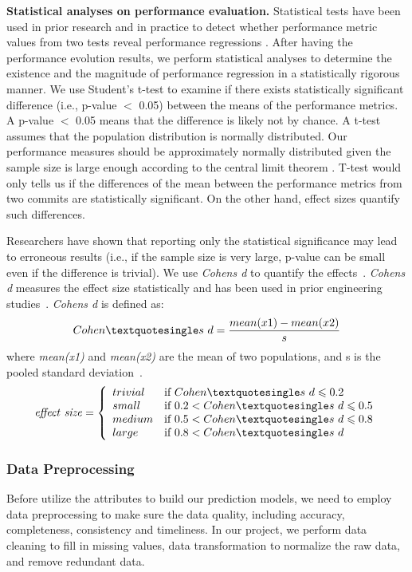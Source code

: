 \textbf{Statistical analyses on performance evaluation.}
Statistical tests have been used in prior research and in practice to detect whether performance metric values from two tests reveal performance regressions \cite{AlGhmadi}. After having the performance evolution results, we perform statistical analyses to determine the existence and the magnitude of performance regression in a statistically rigorous manner. 
We use Student’s t-test to examine if there exists statistically significant difference (i.e., p-value $<$ 0.05) between the means of the performance metrics. A p-value $<$ 0.05 means that the difference is likely not by chance. 
A t-test assumes that the population distribution is normally distributed. Our performance measures should be approximately normally distributed given the sample size is large enough according to the central limit theorem \cite{Chen:2014}.
T-test would only tells us if the differences of the mean between the performance metrics from two commits are statistically significant. On the other hand, effect sizes quantify such differences. 

Researchers have shown that reporting only the statistical significance may lead to erroneous results (i.e., if the sample size is very large, p-value can be small even if the difference is trivial). We use \emph{Cohen\textquotesingle s d} to quantify the effects~\cite{ES2006:Becker}. \emph{Cohen\textquotesingle s d} measures the effect size statistically and has been used in prior engineering studies~\cite{IST2007:Kampenes, ICSE2002:Kitchenham}. \emph{Cohen\textquotesingle s d} is defined as:
$$
Cohen\textquotesingle s \ d=\frac{mean(x1)-mean(x2)}{s}
$$
where \emph{mean(x1)} and \emph{mean(x2)} are the mean of two populations, and s is the pooled standard deviation~\cite{JohnWiley:2011}.
$$
\mathit{effect \ size} = \left\{ \begin{array}{ll}
trivial & \textrm{if $Cohen\textquotesingle s \ d  \leqslant 0.2$}\\
small & \textrm{if $0.2 < Cohen\textquotesingle s \ d \leqslant 0.5$}\\
medium& \textrm{if $0.5 < Cohen\textquotesingle s \ d \leqslant 0.8$}\\
large& \textrm{if $0.8 < Cohen\textquotesingle s \ d$}
\end{array} \right.
$$

\subsubsection{Data Preprocessing}
Before utilize the attributes to build our prediction models, we need to employ data preprocessing to make sure the data quality, including accuracy, completeness, consistency and timeliness. In our project, we perform data cleaning to fill in missing values, data transformation to normalize the raw data, and remove redundant data.

